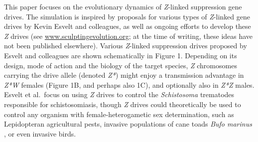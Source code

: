 \documentclass[]{rsos}%
\begin{document}
This paper focuses on the evolutionary dynamics of \emph{Z}-linked
suppression gene drives. The simulation is inspired by proposals for
various types of \emph{Z}-linked gene drives by Kevin Esvelt and
colleagues, as well as ongoing efforts to develop these \emph{Z} drives
(see \href{}{www.sculptingevolution.org}; at the time of writing, these
ideas have not been published elsewhere). Various \emph{Z}-linked
suppression drives proposed by Esvelt and colleagues are shown
schematically in Figure 1. Depending on its design, mode of action and
the biology of the target species, \emph{Z} chromosomes carrying the
drive allele (denoted \emph{Z*}) might enjoy a transmission advantage in
\emph{Z*W} females (Figure 1B, and perhaps also 1C), and optionally also
in \emph{Z*Z} males. Esvelt et al.~focus on using \emph{Z} drives to
control the \emph{Schistosoma} trematodes responsible for
schistosomiasis, though \emph{Z} drives could theoretically be used to
control any organism with female-heterogametic sex determination, such
as Lepidopteran agricultural pests, invasive populations of cane toads
\emph{Bufo marinus} \citep{abramyan2009z}, or even invasive birds.
\end{document}
